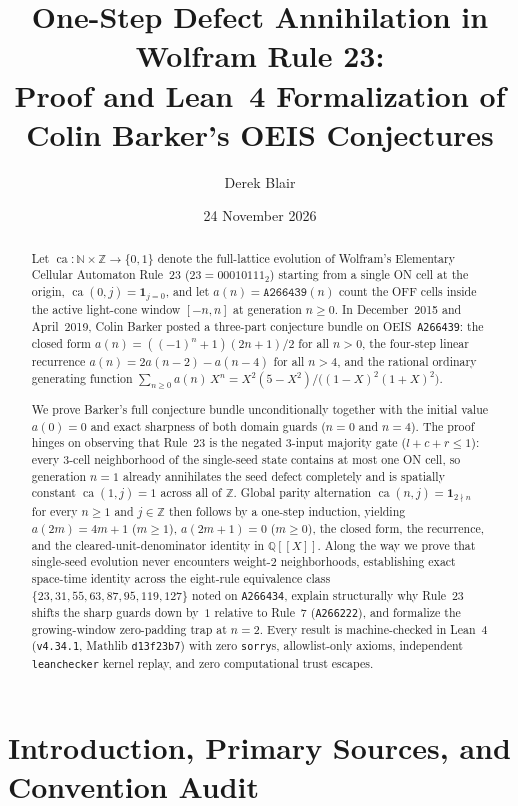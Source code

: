 \documentclass[11pt]{article}
\title{One-Step Defect Annihilation in Wolfram Rule 23:\\[2pt]
\large Proof and Lean~4 Formalization of Colin Barker's OEIS \seq{A266439} Conjectures}
\author{Derek Blair}
\date{24 November 2026}
\newcommand{\llbracket}{[\![}
\newcommand{\rrbracket}{]\!]}
\theoremstyle{definition}
\newcommand{\N}{\mathbb{N}}
\newcommand{\Z}{\mathbb{Z}}
\newcommand{\Q}{\mathbb{Q}}
\newcommand{\seq}[1]{\texttt{#1}}
\newcommand{\ca}{\operatorname{ca}}
\begin{document}
\maketitle

\begin{abstract}
Let $\ca : \N \times \Z \to \{0, 1\}$ denote the full-lattice evolution of Wolfram's Elementary Cellular Automaton Rule~23 ($23 = 00010111_2$) starting from a single ON cell at the origin, $\ca(0, j) = \mathbf{1}_{j=0}$, and let $a(n) = \seq{A266439}(n)$ count the OFF cells inside the active light-cone window $[-n, n]$ at generation $n \ge 0$. In December~2015 and April~2019, Colin Barker posted a three-part conjecture bundle on OEIS~\seq{A266439}: the closed form $a(n) = ((-1)^n + 1)(2n + 1)/2$ for all $n > 0$, the four-step linear recurrence $a(n) = 2a(n-2) - a(n-4)$ for all $n > 4$, and the rational ordinary generating function $\sum_{n \ge 0} a(n)\,X^n = X^2(5 - X^2)/\bigl((1 - X)^2(1 + X)^2\bigr)$.

We prove Barker's full conjecture bundle unconditionally together with the initial value $a(0) = 0$ and exact sharpness of both domain guards ($n = 0$ and $n = 4$). The proof hinges on observing that Rule~23 is the negated $3$-input majority gate ($l + c + r \le 1$): every $3$-cell neighborhood of the single-seed state contains at most one ON cell, so generation $n = 1$ already annihilates the seed defect completely and is spatially constant $\ca(1, j) = 1$ across all of $\Z$. Global parity alternation $\ca(n, j) = \mathbf{1}_{2 \nmid n}$ for every $n \ge 1$ and $j \in \Z$ then follows by a one-step induction, yielding $a(2m) = 4m + 1$ ($m \ge 1$), $a(2m + 1) = 0$ ($m \ge 0$), the closed form, the recurrence, and the cleared-unit-denominator identity in $\Q\llbracket X \rrbracket$. Along the way we prove that single-seed evolution never encounters weight-$2$ neighborhoods, establishing exact space-time identity across the eight-rule equivalence class $\{23, 31, 55, 63, 87, 95, 119, 127\}$ noted on \seq{A266434}, explain structurally why Rule~23 shifts the sharp guards down by~$1$ relative to Rule~7 (\seq{A266222}), and formalize the growing-window zero-padding trap at $n = 2$. Every result is machine-checked in Lean~4 (\texttt{v4.34.1}, Mathlib \texttt{d13f23b7}) with zero \texttt{sorry}s, allowlist-only axioms, independent \texttt{leanchecker} kernel replay, and zero computational trust escapes.
\end{abstract}

\section{Introduction, Primary Sources, and Convention Audit}
\end{document}
